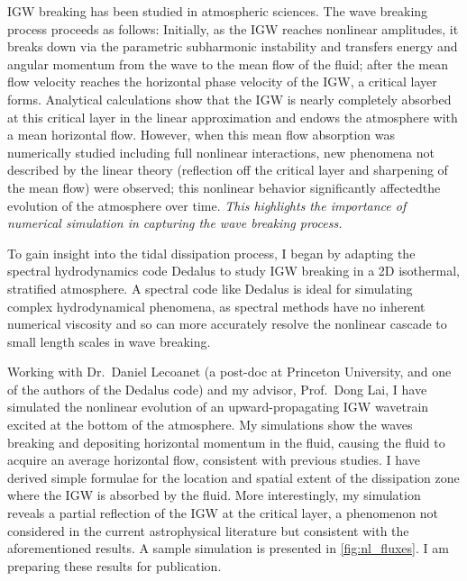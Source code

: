 \documentclass[12pt,
        usenames, %
        dvipsnames %
    ]{article}
\begin{document}
IGW breaking has been studied in atmospheric sciences. The wave
breaking process proceeds as follows: Initially, as the IGW reaches nonlinear
amplitudes, it breaks down via the parametric subharmonic instability and
transfers energy and angular momentum from the wave to the mean flow of the
fluid\cite{drazin}; after the mean flow velocity reaches the
horizontal phase velocity of the IGW, a critical layer forms. Analytical
calculations show that the IGW is nearly completely absorbed at this critical
layer in the linear approximation and endows the atmosphere with a mean
horizontal flow\cite{booker_bretherton,hazel}. However, when this mean flow
absorption was numerically studied including full nonlinear interactions, new
phenomena not described by the linear theory (reflection off the critical layer
and sharpening of the mean flow) were observed\cite{jones_num,winters1994}; this
nonlinear behavior significantly affectedthe evolution of the atmosphere over
time. \emph{This highlights the importance of numerical simulation in capturing
the wave breaking process.}

To gain insight into the tidal dissipation process, I began by adapting the
spectral hydrodynamics code Dedalus\cite{dedalus} to study IGW breaking in a 2D
isothermal, stratified atmosphere. A spectral code like Dedalus is ideal for
simulating complex hydrodynamical phenomena, as spectral methods have no
inherent numerical viscosity and so can more accurately resolve the nonlinear
cascade to small length scales in wave breaking.

Working with Dr.\ Daniel Lecoanet (a post-doc at Princeton University, and one
of the authors of the Dedalus code) and my advisor, Prof.\ Dong Lai, I have
simulated the nonlinear evolution of an upward-propagating IGW wavetrain excited
at the bottom of the atmosphere. My simulations show the waves breaking and
depositing horizontal momentum in the fluid, causing the fluid to acquire an
average horizontal flow, consistent with previous studies\cite{fullerII}. I have
derived simple formulae for the location and spatial extent of the dissipation
zone where the IGW is absorbed by the fluid. More interestingly, my simulation
reveals a partial reflection of the IGW at the critical layer\cite{me}, a
phenomenon not considered in the current astrophysical literature but consistent
with the aforementioned results\cite{winters1994}. A sample simulation is
presented in \autoref{fig:nl_fluxes}. I am preparing these results for
publication\cite{me}.
\end{document}
